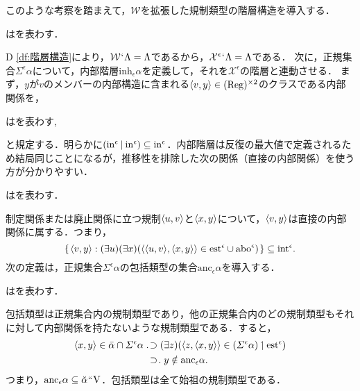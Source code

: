このような考察を踏まえて，$\mathcal{W}$を拡張した規制類型の階層構造を導入する．
\begin{df}
\label{df:規制類型の階層}
はを表わす．
\end{df}
\noindent D \ref{df:階層構造}により，$ \mathcal{W}{\mspace{1mu}{`}\mspace{1mu}}\Lambda = \Lambda $であるから，$ \mathcal{X}^\epsilon{\mspace{1mu}{`}\mspace{1mu}}\Lambda = \Lambda $である．
次に，正規集合$\varSigma^{\epsilon}\alpha$について，内部階層$ \mathrm{inh}_\epsilon\alpha $を定義して，それを$\mathcal{X}^\epsilon$の階層と連動させる．
まず，$y$が$v$のメンバーの内部構造に含まれる$\langle v,y \rangle\in (\mathrm{Reg})^{\times 2}$のクラスである内部関係を，
\begin{df}
\label{df:内部関係}
はを表わす,
\end{df}
\noindent と規定する．明らかに$ (\mathrm{in}^\epsilon\mathbin{\mid}\mathrm{in}^\epsilon)\subseteq \mathrm{in}^\epsilon $．内部階層は反復の最大値で定義されるため結局同じことになるが，推移性を排除した次の関係（直接の内部関係）を使う方が分かりやすい．
\begin{df}
\label{df:直接の内部関係}
はを表わす．
\end{df}

\noindent 制定関係または廃止関係に立つ規制$ \langle u,v \rangle $と$\langle x,y \rangle$について，$ \langle v,y \rangle $は直接の内部関係に属する．つまり，
\[
    \{\mspace{2mu}\langle v,y \rangle:(\exists u)(\exists x)(
        \langle \langle u,v \rangle,\langle x,y \rangle \rangle\in\mathrm{est}^\epsilon\cup\mathrm{abo}^\epsilon
    )\mspace{2mu}\}\subseteq\mathrm{int}^\epsilon.
\]
次の定義は，正規集合$\varSigma^{\epsilon}\alpha$の包括類型の集合$ \mathrm{anc}_\epsilon\alpha $を導入する．
\begin{df}
\label{df:包括類型}
はを表わす．
\end{df}
\noindent 包括類型は正規集合内の規制類型であり，他の正規集合内のどの規制類型もそれに対して内部関係を持たないような規制類型である．すると，
\begin{align*}
    \orp{x,y}\in\bar{\alpha}\cap\varSigma^{\epsilon}\alpha &\case{1}{1}{0}(\exists z)(\orp{z,\orp{x,y}}\in(\varSigma^{\epsilon}\alpha)\uphl\mathrm{est}^\epsilon )\\
    &\:\,\case{1}{0}{1} y\notin \mathrm{anc}_\epsilon\alpha.
\end{align*}
つまり，$\mathrm{anc}_\epsilon\alpha\subseteq\breve{\alpha}{\mspace{1mu}{``}\mspace{1mu}}\mathrm{V}$．包括類型は全て始祖の規制類型である．

